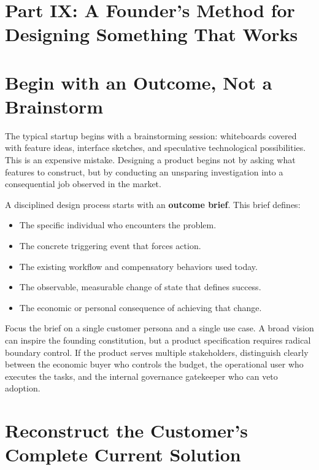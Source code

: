 
\section*{Part IX: A Founder's Method for Designing Something That Works}

\section{Begin with an Outcome, Not a Brainstorm}

The typical startup begins with a brainstorming session: whiteboards covered with feature ideas, interface sketches, and speculative technological possibilities. This is an expensive mistake. Designing a product begins not by asking what features to construct, but by conducting an unsparing investigation into a consequential job observed in the market.

A disciplined design process starts with an \textbf{outcome brief}. This brief defines:
\begin{itemize}[leftmargin=*]
\item The specific individual who encounters the problem.
\item The concrete triggering event that forces action.
\item The existing workflow and compensatory behaviors used today.
\item The observable, measurable change of state that defines success.
\item The economic or personal consequence of achieving that change.
\end{itemize}

Focus the brief on a single customer persona and a single use case. A broad vision can inspire the founding constitution, but a product specification requires radical boundary control. If the product serves multiple stakeholders, distinguish clearly between the economic buyer who controls the budget, the operational user who executes the tasks, and the internal governance gatekeeper who can veto adoption.

\section{Reconstruct the Customer's Complete Current Solution}

